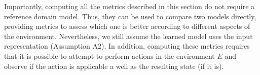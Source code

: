 \documentclass[letterpaper]{article} %
\newif\ifaddcomments
\newcommand{\roni}[1]{\ifaddcomments{\textcolor{red}{[Roni: #1]}}\fi}
\begin{document}
Importantly, computing all the metrics described in this section do not require a reference domain model. 
Thus, they can be used to compare two models directly,  providing metrics to assess which one is better according to different aspects of the environment. 
Nevertheless, we still assume the learned model uses the input representation (Assumption A2).  
In addition, computing these metrics requires that it is possible to attempt to perform actions in the environment $E$ and observe if the action is applicable a well as the resulting state (if it is). %








\end{document}

